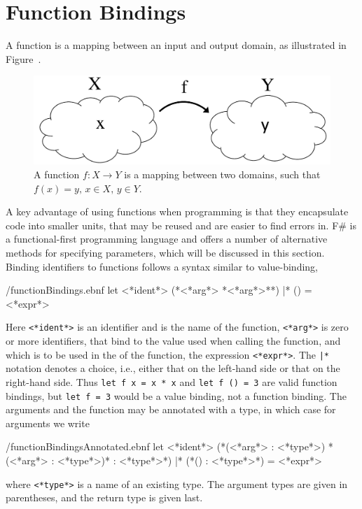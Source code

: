 \documentclass[fsharpNotes.tex]{subfiles}
\begin{document}
\section{Function Bindings}
\label{sec:functions}
A function is a mapping between an input and output domain, as illustrated in Figure~.
\begin{figure}
  \centering
  \includegraphics[width=0.6\linewidth]{functions}
  \caption{A function $f:X\rightarrow Y$ is a mapping between two domains, such that $f(x)=y,\, x\in X,\, y\in Y$.}
  \label{fig:functions}
\end{figure}
A key advantage of using functions when programming is that they encapsulate code into smaller units, that may be reused and are easier to find errors in. F\# is a functional-first programming language and offers a number of alternative methods for specifying parameters, which will be discussed in this section. Binding identifiers to functions follows a syntax similar to value-binding,
%
\begin{verbatimwrite}{\ebnf/functionBindings.ebnf}
let <*ident*> (*<*arg*> {*<*arg*>*}*) |* () =
  <*expr*>
\end{verbatimwrite}
%
Here \lstinline[language=syntax]{<*ident*>} is an identifier and is the name of the function, \lstinline[language=syntax]{<*arg*>} is zero or more identifiers, that bind to the value used when calling the function, and which is to be used in the  of the function, the expression \lstinline[language=syntax]{<*expr*>}. The \lstinline[language=syntax]{|*} notation denotes a choice, i.e., either that on the left-hand side or that on the right-hand side. Thus \lstinline{let f x = x * x} and \lstinline{let f () = 3} are valid function bindings, but \lstinline{let f = 3} would be a value binding, not a function binding. The arguments and the function may be annotated with a type, in which case for arguments we write
%
\begin{verbatimwrite}{\ebnf/functionBindingsAnnotated.ebnf}
let <*ident*> (*(<*arg*> : <*type*>) {*(<*arg*> : <*type*>)*} : <*type*>*) |* (*() : <*type*>*) =
  <*expr*>
\end{verbatimwrite}
%
where \lstinline[language=syntax]{<*type*>} is a name of an existing type. The argument types are given in parentheses, and the return type is given last. 
\end{document}
